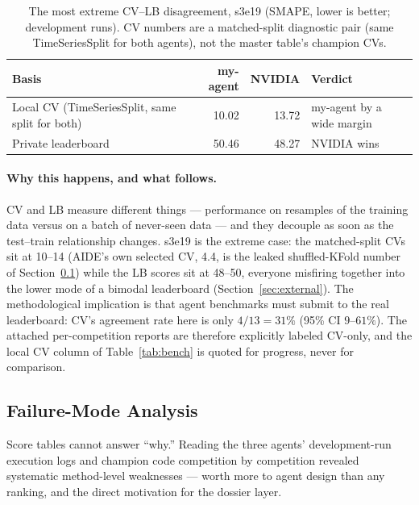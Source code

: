 \documentclass[11pt,a4paper]{article}
\begin{document}
\begin{table}[htbp]
\centering\small
\caption{The most extreme CV--LB disagreement, s3e19 (SMAPE, lower is better; development runs). CV numbers are a matched-split diagnostic pair (same TimeSeriesSplit for both agents), not the master table's champion CVs.}
\label{tab:cvlb}
\begin{tabular}{@{}lrrl@{}}
\toprule
\textbf{Basis} & \textbf{my-agent} & \textbf{NVIDIA} & \textbf{Verdict} \\
\midrule
Local CV (TimeSeriesSplit, same split for both) & 10.02 & 13.72 & my-agent by a wide margin \\
Private leaderboard & 50.46 & 48.27 & NVIDIA wins \\
\bottomrule
\end{tabular}
\end{table}

\paragraph{Why this happens, and what follows.} CV and LB measure different things --- performance on resamples of the training data versus on a batch of never-seen data --- and they decouple as soon as the test--train relationship changes. s3e19 is the extreme case: the matched-split CVs sit at 10--14 (AIDE's own selected CV, 4.4, is the leaked shuffled-KFold number of Section~\ref{sec:exp4}) while the LB scores sit at 48--50, everyone misfiring together into the lower mode of a bimodal leaderboard (Section~\ref{sec:external}). The methodological implication is that agent benchmarks must submit to the real leaderboard: CV's agreement rate here is only $4/13 = 31\%$ (95\% CI $9$--$61\%$). The attached per-competition reports are therefore explicitly labeled CV-only, and the local CV column of Table~\ref{tab:bench} is quoted for progress, never for comparison.

\subsection{Failure-Mode Analysis}
\label{sec:exp4}

Score tables cannot answer ``why.'' Reading the three agents' development-run execution logs and champion code competition by competition revealed systematic method-level weaknesses --- worth more to agent design than any ranking, and the direct motivation for the dossier layer.
\end{document}
